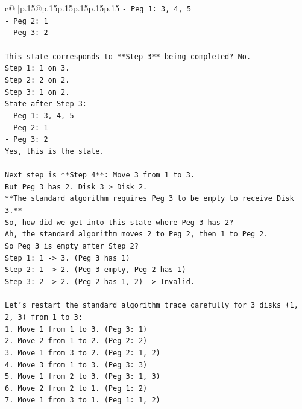\documentclass{article}
\begin{document}
{\begin{supertabular}{c@{$\;$}|p{.15\linewidth}@{}p{.15\linewidth}p{.15\linewidth}p{.15\linewidth}p{.15\linewidth}p{.15\linewidth}}
{{{\texttt{{-} Peg 1: 3, 4, 5} \\
\texttt{{-} Peg 2: 1} \\
\texttt{{-} Peg 3: 2} \\
\\ 
\texttt{This state corresponds to **Step 3** being completed? No.} \\
\texttt{Step 1: 1 on 3.} \\
\texttt{Step 2: 2 on 2.} \\
\texttt{Step 3: 1 on 2.} \\
\texttt{State after Step 3:} \\
\texttt{{-} Peg 1: 3, 4, 5} \\
\texttt{{-} Peg 2: 1} \\
\texttt{{-} Peg 3: 2} \\
\texttt{Yes, this is the state.} \\
\\ 
\texttt{Next step is **Step 4**: Move 3 from 1 to 3.} \\
\texttt{But Peg 3 has 2. Disk 3 > Disk 2.} \\
\texttt{**The standard algorithm requires Peg 3 to be empty to receive Disk 3.**} \\
\texttt{So, how did we get into this state where Peg 3 has 2?} \\
\texttt{Ah, the standard algorithm moves 2 to Peg 2, then 1 to Peg 2.} \\
\texttt{So Peg 3 is empty after Step 2?} \\
\texttt{Step 1: 1 {-}> 3. (Peg 3 has 1)} \\
\texttt{Step 2: 1 {-}> 2. (Peg 3 empty, Peg 2 has 1)} \\
\texttt{Step 3: 2 {-}> 2. (Peg 2 has 1, 2) {-}> Invalid.} \\
\\ 
\texttt{Let's restart the standard algorithm trace carefully for 3 disks (1, 2, 3) from 1 to 3:} \\
\texttt{1. Move 1 from 1 to 3. (Peg 3: 1)} \\
\texttt{2. Move 2 from 1 to 2. (Peg 2: 2)} \\
\texttt{3. Move 1 from 3 to 2. (Peg 2: 1, 2)} \\
\texttt{4. Move 3 from 1 to 3. (Peg 3: 3)} \\
\texttt{5. Move 1 from 2 to 3. (Peg 3: 1, 3)} \\
\texttt{6. Move 2 from 2 to 1. (Peg 1: 2)} \\
\texttt{7. Move 1 from 3 to 1. (Peg 1: 1, 2)} \\
}}}
\end{supertabular}}
\end{document}
